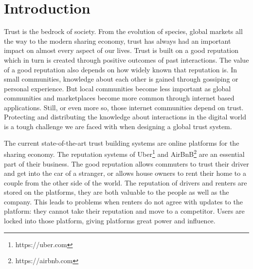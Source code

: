 \chapter{Introduction}
\label{chap:introduction}



Trust is the bedrock of society. From the evolution of species, global markets all the way to the 
modern sharing economy, trust has always had an important impact on almost every aspect of our lives.
Trust is built on a good reputation which in turn is created through positive outcomes of past 
interactions. The value of a good reputation also depends on how widely known that reputation is.
In small communities, knowledge about each other is gained through gossiping or personal experience. 
But local communities become less important as global communities and marketplaces become more common
through internet based applications. Still, or even more so, those internet communities depend on 
trust. Protecting and distributing the knowledge about interactions in the digital world is a tough
challenge we are faced with when designing a global trust system.

The current state-of-the-art trust building systems are online platforms for the sharing economy.
The reputation systems of Uber\footnote{https://uber.com} and AirBnB\footnote{https://airbnb.com} are
an essential part of their business. The good reputation allows commuters to trust their driver and
get into the car of a stranger, or allows house owners to rent their home to a couple from the other
side of the world. The reputation of drivers and renters are stored on the platforms, they are both
valuable to the people as well as the company. This leads to problems when renters do not agree with
updates to the platform: they cannot take their reputation and move to a competitor. Users are locked
into those platform, giving platforms great power and influence. 

